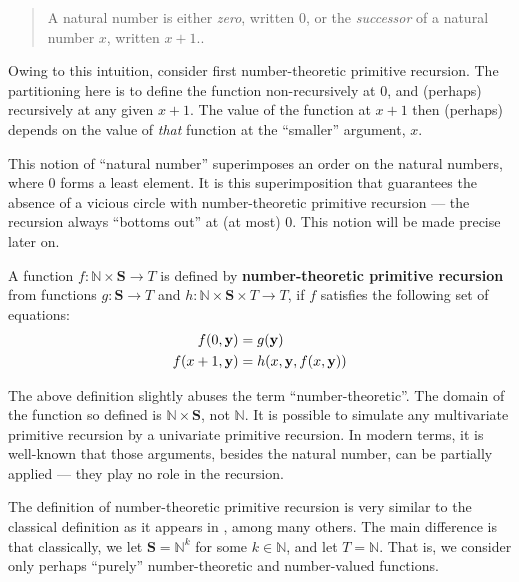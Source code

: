 \begin{quote}

A natural number is either \emph{zero}, written $0$, or the \emph{successor} of
a natural number $x$, written $x+1$.\cite{dedekind-1888, rose-1984,
odifreddi-1989}.

\end{quote}


Owing to this intuition, consider first number-theoretic primitive recursion.
The partitioning here is to define the function non-recursively at $0$, and
(perhaps) recursively at any given $x+1$. The value of the function at $x+1$
then (perhaps) depends on the value of \emph{that} function at the ``smaller''
argument, $x$.

This notion of ``natural number'' superimposes an order on the natural numbers,
where $0$ forms a least element. It is this superimposition that guarantees the
absence of a vicious circle with number-theoretic primitive recursion --- the
recursion always ``bottoms out'' at (at most) $0$. This notion will be made
precise later on.

\begin{definition} \label{def:number-theoretic-primitive-recursion} A function
$f : \mathbb{N} \times \mathbf{S} \rightarrow T$ is defined by
\textbf{number-theoretic primitive recursion} from functions $g : \mathbf{S}
\rightarrow T$ and $h : \mathbb{N} \times \mathbf{S} \times T \rightarrow T$,
if $f$ satisfies the following set of equations:\begin{align*}
%
f\p{0, \mathbf{y}} &= g\p{\mathbf{y}}\\
%
f\p{x+1, \mathbf{y}} &= h\p{x,\mathbf{y},f\p{x,\mathbf{y}}}
%
\end{align*}\end{definition}

\begin{remark} The above definition slightly abuses the term
``number-theoretic''. The domain of the function so defined is $\mathbb{N}
\times \mathbf{S}$, not $\mathbb{N}$. It is possible to simulate any
multivariate primitive recursion by a univariate primitive
recursion\cite{rose-1984}.  In modern terms, it is well-known that those
arguments, besides the natural number, can be partially applied --- they play
no role in the recursion.  \end{remark}

\begin{remark} The definition of number-theoretic primitive recursion is very
similar to the classical definition as it appears in \cite{dedekind-1888,
goedel-1944, rose-1984, odifreddi-1989}, among many others. The main difference
is that classically, we let $\mathbf{S}=\mathbb{N}^k$ for some $k \in
\mathbb{N}$, and let $T = \mathbb{N}$. That is, we consider only perhaps
``purely'' number-theoretic and number-valued functions. \end{remark}

